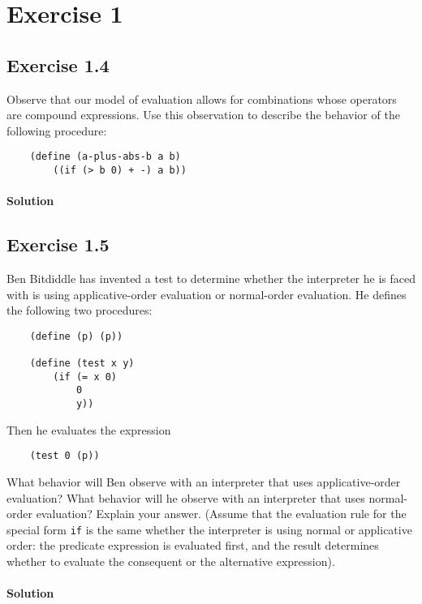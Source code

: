 \section*{Exercise 1}

\subsection*{Exercise 1.4}
Observe that our model of evaluation allows for combinations whose operators are compound expressions. Use this observation to 
describe the behavior of the following procedure:

\begin{lstlisting}
    (define (a-plus-abs-b a b) 
        ((if (> b 0) + -) a b))
\end{lstlisting}

\paragraph{Solution}


\subsection*{Exercise 1.5}
Ben Bitdiddle has invented a test to determine whether the interpreter he is faced with is using applicative-order evaluation 
or normal-order evaluation. He defines the following two procedures:

\begin{lstlisting}
    (define (p) (p))

    (define (test x y)
        (if (= x 0) 
            0 
            y))
\end{lstlisting}

Then he evaluates the expression

\begin{lstlisting}
    (test 0 (p))
\end{lstlisting}

What behavior will Ben observe with an interpreter that uses applicative-order evaluation? What behavior will he
observe with an interpreter that uses normal-order evaluation? Explain your answer. (Assume that the evaluation
rule for the special form \texttt{if} is the same whether the interpreter is using normal or applicative order: the predicate 
expression is evaluated first, and the result determines whether to evaluate the consequent or the alternative expression).

\paragraph{Solution}